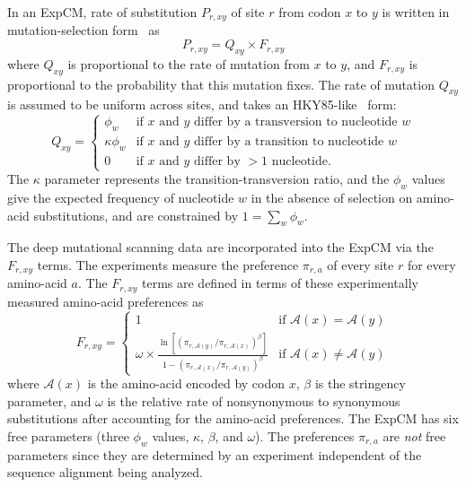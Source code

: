 \documentclass[11pt]{article}
\begin{document}
In an ExpCM, rate of substitution $P_{r,xy}$ of site $r$ from codon $x$ to $y$ is written in mutation-selection form~\citep{halpern1998evolutionary,mccandlish2014modeling,spielman2015relationship} as
\begin{equation}
P_{r,xy} = Q_{xy} \times F_{r,xy}
\end{equation}
where $Q_{xy}$ is proportional to the rate of mutation from $x$ to $y$, and $F_{r,xy}$ is proportional to the probability that this mutation fixes.
The rate of mutation $Q_{xy}$ is assumed to be uniform across sites, and takes an HKY85-like~\citep{hasegawa1985dating} form:
\begin{equation}
Q_{xy} = 
\begin{cases}
\phi_w & \mbox{if $x$ and $y$ differ by a transversion to nucleotide $w$} \\
\kappa \phi_w & \mbox{if $x$ and $y$ differ by a transition to nucleotide $w$} \\
0 & \mbox{if $x$ and $y$ differ by $>1$ nucleotide.}
\end{cases}
\end{equation}
The $\kappa$ parameter represents the transition-transversion ratio, and the $\phi_w$ values give the expected frequency of nucleotide $w$ in the absence of selection on amino-acid substitutions, and are constrained by $1 = \sum_w \phi_w$.

The deep mutational scanning data are incorporated into the ExpCM via the $F_{r,xy}$ terms.
The experiments measure the preference $\pi_{r,a}$ of every site $r$ for every amino-acid $a$.
The $F_{r,xy}$ terms are defined in terms of these experimentally measured amino-acid preferences as
\begin{equation}
\label{eq:Frxy}
F_{r,xy} = 
\begin{cases}
   1 & \mbox{if $\mathcal{A}\left(x\right) = \mathcal{A}\left(y\right)$} \\
   \omega \times \frac{\ln\left[\left(\pi_{r,\mathcal{A}\left(y\right)} / \pi_{r,\mathcal{A}\left(x\right)}\right)^{\beta}\right]}{1 - \left(\pi_{r,\mathcal{A}\left(x\right)} / \pi_{r,\mathcal{A}\left(y\right)}\right)^{\beta}} & \mbox{if $\mathcal{A}\left(x\right) \ne \mathcal{A}\left(y\right)$}
   \end{cases}
\end{equation}
where $\mathcal{A}\left(x\right)$ is the amino-acid encoded by codon $x$, $\beta$ is the stringency parameter, and $\omega$ is the relative rate of nonsynonymous to synonymous substitutions after accounting for the amino-acid preferences.
The ExpCM has six free parameters (three $\phi_w$ values, $\kappa$, $\beta$, and $\omega$).
The preferences $\pi_{r,a}$ are \emph{not} free parameters since they are determined by an experiment independent of the sequence alignment being analyzed.
\end{document}

